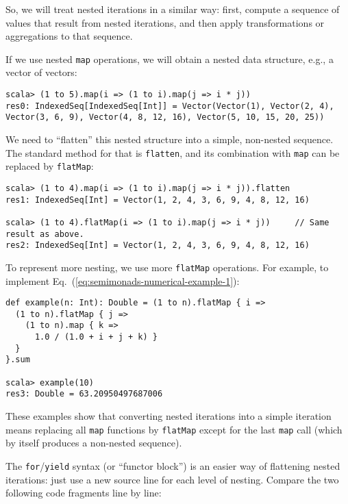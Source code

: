 So, we will treat nested iterations in a similar way: first, compute
a sequence of values that result from nested iterations, and then
apply transformations or aggregations to that sequence.

If we use nested \lstinline!map! operations, we will obtain a nested
data structure, e.g., a vector of vectors:
\begin{lstlisting}
scala> (1 to 5).map(i => (1 to i).map(j => i * j))
res0: IndexedSeq[IndexedSeq[Int]] = Vector(Vector(1), Vector(2, 4), Vector(3, 6, 9), Vector(4, 8, 12, 16), Vector(5, 10, 15, 20, 25))
\end{lstlisting}
We need to \textsf{``}flatten\textsf{''} this nested structure into a simple, non-nested
sequence. The standard method for that is \lstinline!flatten!, and
its combination with \lstinline!map! can be replaced by \lstinline!flatMap!:
\begin{lstlisting}
scala> (1 to 4).map(i => (1 to i).map(j => i * j)).flatten
res1: IndexedSeq[Int] = Vector(1, 2, 4, 3, 6, 9, 4, 8, 12, 16)

scala> (1 to 4).flatMap(i => (1 to i).map(j => i * j))     // Same result as above.
res2: IndexedSeq[Int] = Vector(1, 2, 4, 3, 6, 9, 4, 8, 12, 16)
\end{lstlisting}
To represent more nesting, we use more \lstinline!flatMap! operations.
For example, to implement Eq.~(\ref{eq:semimonads-numerical-example-1}):
\begin{lstlisting}
def example(n: Int): Double = (1 to n).flatMap { i =>
  (1 to n).flatMap { j =>
    (1 to n).map { k => 
      1.0 / (1.0 + i + j + k) }
  }
}.sum

scala> example(10)
res3: Double = 63.20950497687006
\end{lstlisting}
These examples show that converting nested iterations into a simple
iteration means replacing all \lstinline!map! functions by \lstinline!flatMap!
except for the last \lstinline!map! call (which by itself produces
a non-nested sequence).

The \lstinline!for!/\lstinline!yield! syntax (or \textsf{``}functor block\textsf{''})
is an easier way of flattening nested iterations: just use a new source
line for each level of nesting. Compare the two following code fragments
line by line:

